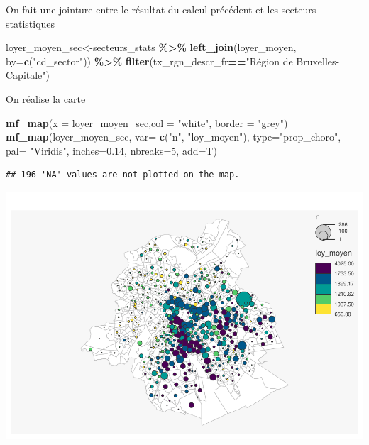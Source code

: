 \documentclass[
]{book}
\newenvironment{Shaded}{\begin{snugshade}}{\end{snugshade}}
\newcommand{\AttributeTok}[1]{\textcolor[rgb]{0.13,0.29,0.53}{#1}}
\newcommand{\DecValTok}[1]{\textcolor[rgb]{0.00,0.00,0.81}{#1}}
\newcommand{\FloatTok}[1]{\textcolor[rgb]{0.00,0.00,0.81}{#1}}
\newcommand{\FunctionTok}[1]{\textcolor[rgb]{0.13,0.29,0.53}{\textbf{#1}}}
\newcommand{\NormalTok}[1]{#1}
\newcommand{\OtherTok}[1]{\textcolor[rgb]{0.56,0.35,0.01}{#1}}
\newcommand{\SpecialCharTok}[1]{\textcolor[rgb]{0.81,0.36,0.00}{\textbf{#1}}}
\newcommand{\StringTok}[1]{\textcolor[rgb]{0.31,0.60,0.02}{#1}}
\begin{document}
On fait une jointure entre le résultat du calcul précédent et les
secteurs statistiques

\begin{Shaded}
\begin{Highlighting}[]
\NormalTok{loyer\_moyen\_sec}\OtherTok{\textless{}{-}}\NormalTok{secteurs\_stats }\SpecialCharTok{\%\textgreater{}\%}
  \FunctionTok{left\_join}\NormalTok{(loyer\_moyen, }\AttributeTok{by=}\FunctionTok{c}\NormalTok{(}\StringTok{"cd\_sector"}\NormalTok{)) }\SpecialCharTok{\%\textgreater{}\%}
  \FunctionTok{filter}\NormalTok{(tx\_rgn\_descr\_fr}\SpecialCharTok{==}\StringTok{"Région de Bruxelles{-}Capitale"}\NormalTok{)}
\end{Highlighting}
\end{Shaded}

On réalise la carte

\begin{Shaded}
\begin{Highlighting}[]
\FunctionTok{mf\_map}\NormalTok{(}\AttributeTok{x =}\NormalTok{ loyer\_moyen\_sec,}\AttributeTok{col =} \StringTok{"white"}\NormalTok{, }\AttributeTok{border =} \StringTok{"grey"}\NormalTok{)}
\FunctionTok{mf\_map}\NormalTok{(loyer\_moyen\_sec,}
       \AttributeTok{var=} \FunctionTok{c}\NormalTok{(}\StringTok{"n"}\NormalTok{, }\StringTok{"loy\_moyen"}\NormalTok{),}
       \AttributeTok{type=}\StringTok{"prop\_choro"}\NormalTok{,}
       \AttributeTok{pal=} \StringTok{"Viridis"}\NormalTok{,}
       \AttributeTok{inches=}\FloatTok{0.14}\NormalTok{,}
       \AttributeTok{nbreaks=}\DecValTok{5}\NormalTok{,}
       \AttributeTok{add=}\NormalTok{T)}
\end{Highlighting}
\end{Shaded}

\begin{verbatim}
## 196 'NA' values are not plotted on the map.
\end{verbatim}

\includegraphics{manuel_geo_quanti_files/figure-latex/unnamed-chunk-25-1.pdf}
\end{document}
